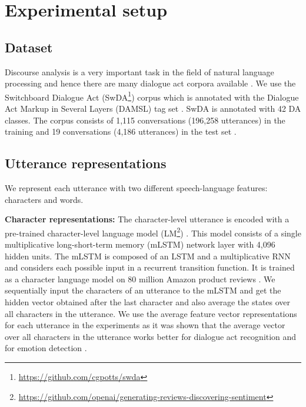 \documentclass[a4paper]{article}
\begin{document}
\section{Experimental setup}

\subsection{Dataset}

Discourse analysis is a very important task in the field of natural language processing and hence there are many dialogue act corpora available \cite{serban2015survey}. We use the Switchboard Dialogue Act (SwDA\footnote{\url{https://github.com/cgpotts/swda}}) corpus which is annotated with the Dialogue Act Markup in Several Layers (DAMSL) tag set \cite{godfrey1992switchboard,shribergSwitch}. SwDA is annotated with 42 DA classes. 
The corpus consists of 1,115 conversations (196,258 utterances) in the training and 19 conversations (4,186 utterances) in the test set \cite{stolcke2000dialogue,kalchbrenner2013recurrent}.

\subsection{Utterance representations}
\label{sec:utt_rep}

We represent each utterance with two different speech-language features: characters and words. 

\textbf{Character representations:} The character-level utterance is encoded with a pre-trained character-level language model (LM\footnote{\url{https://github.com/openai/generating-reviews-discovering-sentiment}}) \cite{Radford2017LearningSentiment}. 
This model consists of a single multiplicative long-short-term memory (mLSTM) network \cite{krause2016multiplicative} layer with 4,096 hidden units. 
The mLSTM is composed of an LSTM and a multiplicative RNN and considers each possible input in a recurrent transition function.
It is trained as a character language model on 80 million Amazon product reviews \cite{Radford2017LearningSentiment}.
We sequentially input the characters of an utterance to the mLSTM and get the hidden vector obtained after the last character and also average the states over all characters in the utterance.
We use the average feature vector representations for each utterance in the experiments as it was shown that the average vector over all characters in the utterance works better for dialogue act recognition \cite{BOTHE18_525} and for emotion detection \cite{labothe2017WASSA2017}. 
\end{document}
